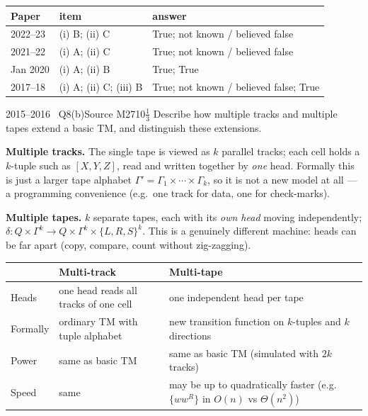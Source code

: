 \documentclass[11pt,a4paper]{article}
\begin{document}
\begin{solution}
\begin{center}\small\begin{tabular}{lll}\toprule Paper & item & answer\\\midrule
2022--23 & (i) B; (ii) C & True; not known / believed false\\
2021--22 & (i) A; (ii) C & True; not known / believed false\\
Jan 2020 & (i) A; (ii) B & True; True\\
2017--18 & (i) A; (ii) C; (iii) B & True; not known / believed false; True\\\bottomrule\end{tabular}\end{center}
\end{solution}

\begin{question}{2015--2016 \textbullet\ Q8(b)}{Source M27}{10$\tfrac13$}
Describe how multiple tracks and multiple tapes extend a basic TM, and distinguish these extensions.
\end{question}
\begin{solution}
\textbf{Multiple tracks.} The single tape is viewed as $k$ parallel tracks; each cell holds a $k$-tuple such as $[X,Y,Z]$, read and written together by \emph{one} head. Formally this is just a larger tape alphabet $\Gamma'=\Gamma_1\times\cdots\times\Gamma_k$, so it is not a new model at all --- a programming convenience (e.g.\ one track for data, one for check-marks).

\textbf{Multiple tapes.} $k$ separate tapes, each with its \emph{own head} moving independently; $\delta:Q\times\Gamma^k\to Q\times\Gamma^k\times\{L,R,S\}^k$. This is a genuinely different machine: heads can be far apart (copy, compare, count without zig-zagging).

\begin{center}\small\begin{tabularx}{\linewidth}{@{}l X X@{}}\toprule & Multi-track & Multi-tape\\\midrule
Heads & one head reads all tracks of one cell & one independent head per tape\\
Formally & ordinary TM with tuple alphabet & new transition function on $k$-tuples and $k$ directions\\
Power & same as basic TM & same as basic TM (simulated with $2k$ tracks)\\
Speed & same & may be up to quadratically faster (e.g.\ $\{ww^R\}$ in $O(n)$ vs $\Theta(n^2)$)\\\bottomrule\end{tabularx}\end{center}
\end{solution}
\end{document}
